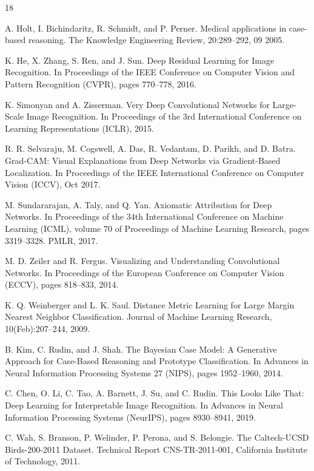 \documentclass[conference]{IEEEtran}
\begin{document}
\begin{thebibliography}{18}

 A. Holt, I. Bichindaritz, R. Schmidt, and P. Perner. Medical applications in case-based reasoning. The Knowledge Engineering Review, 20:289–292, 09 2005.

 K. He, X. Zhang, S. Ren, and J. Sun. Deep Residual Learning for Image Recognition. In Proceedings of the IEEE Conference on Computer Vision and Pattern Recognition (CVPR), pages 770–778, 2016.

 K. Simonyan and A. Zisserman. Very Deep Convolutional Networks for Large-Scale Image Recognition. In Proceedings of the 3rd International Conference on Learning Representations (ICLR), 2015.

 R. R. Selvaraju, M. Cogswell, A. Das, R. Vedantam, D. Parikh, and D. Batra. Grad-CAM: Visual Explanations from Deep Networks via Gradient-Based Localization. In Proceedings of the IEEE International Conference on Computer Vision (ICCV), Oct 2017.

 M. Sundararajan, A. Taly, and Q. Yan. Axiomatic Attribution for Deep Networks. In Proceedings of the 34th International Conference on Machine Learning (ICML), volume 70 of Proceedings of Machine Learning Research, pages 3319–3328. PMLR, 2017.

 M. D. Zeiler and R. Fergus. Visualizing and Understanding Convolutional Networks. In Proceedings of the European Conference on Computer Vision (ECCV), pages 818–833, 2014.

 K. Q. Weinberger and L. K. Saul. Distance Metric Learning for Large Margin Nearest Neighbor Classification. Journal of Machine Learning Research, 10(Feb):207–244, 2009.

 B. Kim, C. Rudin, and J. Shah. The Bayesian Case Model: A Generative Approach for Case-Based Reasoning and Prototype Classification. In Advances in Neural Information Processing Systems 27 (NIPS), pages 1952–1960, 2014.

 C. Chen, O. Li, C. Tao, A. Barnett, J. Su, and C. Rudin. This Looks Like That: Deep Learning for Interpretable Image Recognition. In Advances in Neural Information Processing Systems (NeurIPS), pages 8930–8941, 2019.

 C. Wah, S. Branson, P. Welinder, P. Perona, and S. Belongie. The Caltech-UCSD Birds-200-2011 Dataset. Technical Report CNS-TR-2011-001, California Institute of Technology, 2011.


\end{thebibliography}
\end{document}
